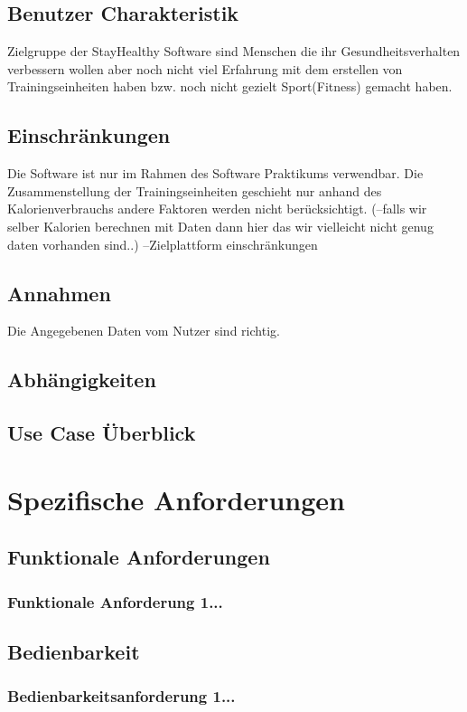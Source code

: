 \documentclass[12pt,a4paper,onecolumn]{article}
\begin{document}
\subsection{Benutzer Charakteristik}
Zielgruppe der StayHealthy Software sind Menschen die ihr Gesundheitsverhalten verbessern wollen aber noch nicht viel Erfahrung mit dem erstellen von Trainingseinheiten haben bzw. noch nicht gezielt Sport(Fitness) gemacht haben.
\subsection{Einschränkungen}
Die Software ist nur im Rahmen des Software Praktikums verwendbar.
Die Zusammenstellung der Trainingseinheiten geschieht nur anhand des Kalorienverbrauchs andere Faktoren werden nicht berücksichtigt.
(--falls wir selber Kalorien berechnen mit Daten dann hier das wir vielleicht nicht genug daten vorhanden sind..)
--Zielplattform einschränkungen
\subsection{Annahmen}
Die Angegebenen Daten vom Nutzer sind richtig.
\subsection{Abhängigkeiten}
\subsection{Use Case Überblick}

\section{Spezifische Anforderungen}
\subsection{Funktionale Anforderungen}
\subsubsection{Funktionale Anforderung 1...}
\subsection{Bedienbarkeit}
\subsubsection{Bedienbarkeitsanforderung 1...}
\end{document}
